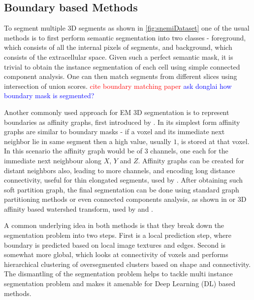 \subsection{Boundary based Methods}
To segment multiple 3D segments as shown in \autoref{fig:snemiDataset} one of the usual methods is to first perform semantic segmentation into two classes - foreground, which consists of all the internal pixels of segments, and background, which consists of the extracellular space. Given such a perfect semantic mask, it is trivial to obtain the instance segmentation of each cell using simple connected component analysis. One can then match segments from different slices using intersection of union scores. \textcolor{red}{cite boundary matching paper} \textcolor{blue}{ask donglai how boundary mask is segmented?}

Another commonly used approach for EM 3D segmentation is to represent boundaries as affinity graphs, first introduced by \cite{Turaga2010}. In its simplest form affinity graphs are similar to boundary masks - if a voxel and its immediate next neighbor lie in same segment then a high value, usually $1$, is stored at that voxel. In this scenario the affinity graph would be of $3$ channels, one each for the immediate next neighbour along $X$, $Y$ and $Z$. Affinity graphs can be created for distant neighbors also, leading to more channels, and encoding long distance connectivity, useful for thin elongated segments, used by \cite{Kisuk2017}. After obtaining such soft partition graph, the final segmentation can be done using standard graph partitioning methods or even connected components analysis, as shown in \cite{Turaga2010} or 3D affinity based watershed transform, used by \cite{Kisuk2017} and \cite{Aleks2015WatershedClustering}.

A common underlying idea in both methods is that they break down the segmentation problem into two steps. First is a local prediction step, where boundary is predicted based on local image textures and edges. Second is somewhat more global, which looks at connectivity of voxels and performs hierarchical clustering of oversegmented clusters based on shape and connectivity. The dismantling of the segmentation problem helps to tackle multi instance segmentation problem and makes it amenable for Deep Learning (DL) based methods.

